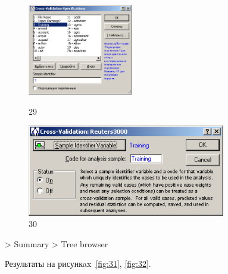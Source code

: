 \begin{figure}[!h]
  \centering

  \begin{minipage}{0.49\textwidth}
    \centering

    \includegraphics[height=4cm]
    {inc/29.PNG}

    \caption{29}

    \label{fig:29}
  \end{minipage}
  \begin{minipage}{0.49\textwidth}
    \centering

    \includegraphics[height=4cm]
    {inc/30.PNG}

    \caption{30}

    \label{fig:30}
  \end{minipage}
\end{figure}

\newpage

> Summary > Tree browser

Результаты на рисункax~\ref{fig:31}, \ref{fig:32}.

